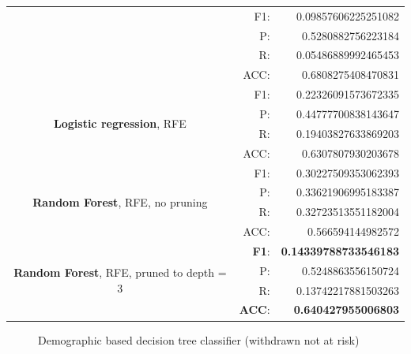 \documentclass{article}
\begin{document}
\begin{center}
\begin{tabular}{|c|rr|}
&F1:&  0.09857606225251082\\
&P:&   0.5280882756223184\\
&R:&   0.05486889992465453\\
&ACC:& 0.6808275408470831\\
\hline
\multirow{4}{10cm}{\textbf{Logistic regression}, RFE}
&F1:&  0.22326091573672335\\
&P:&   0.44777700838143647\\
&R:&   0.19403827633869203\\
&ACC:& 0.6307807930203678\\
\hline
\multirow{4}{10cm}{\textbf{Random Forest}, RFE, no pruning }
&F1:&  0.30227509353062393 \\
&P:&   0.33621906995183387 \\
&R:&   0.32723513551182004 \\
&ACC:& 0.566594144982572 \\
\hline
\multirow{4}{10cm}{\textbf{Random Forest}, RFE, pruned to depth = 3}
&\textbf{F1}:&  \textbf{0.14339788733546183} \\
&P:&   0.5248863556150724 \\
&R:& 0.13742217881503263 \\
&\textbf{ACC}:& \textbf{0.640427955006803} \\
\hline
\end{tabular}
\end{center}
\begin{figure}[ht!]
	\centering
	\caption{Demographic based decision tree classifier (withdrawn not at risk)}
	\label{fig:demographic_dtree_pruned_nowd}
\end{figure}
\end{document}
